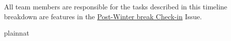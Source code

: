 \documentclass[12pt, titlepage]{article}
\begin{document}
All team members are responsible for the tasks described in this timeline breakdown are features in the
\hyperlink{https://github.com/AhmedAl-Hayali/GenreGuru/issues/278}{Post-Winter break Check-in} Issue.





 {plainnat}


\newpage{}
\end{document}
